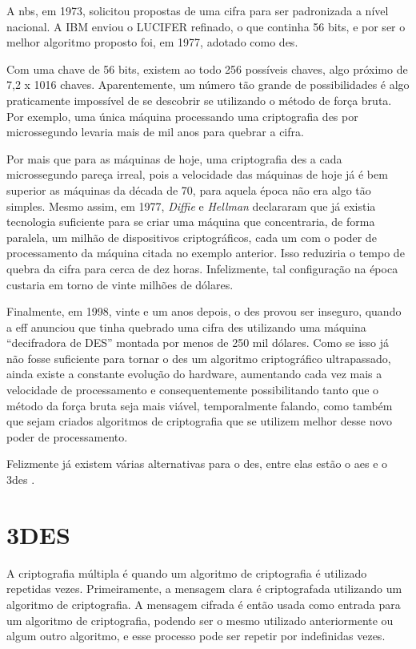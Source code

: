 A \acrfull{nbs}, em 1973, solicitou propostas de uma cifra para ser padronizada a nível nacional. A IBM enviou o LUCIFER refinado, o que continha 56 bits, e por ser o melhor algoritmo proposto foi, em 1977, adotado como \acrfull{des}.

Com uma chave de 56 bits, existem ao todo 256 possíveis chaves, algo próximo de 7,2 x 1016 chaves. Aparentemente, um número tão grande de possibilidades é algo praticamente impossível de se descobrir se utilizando o método de força bruta. Por exemplo, uma única máquina processando uma criptografia \acrshort{des} por microssegundo levaria mais de mil anos para quebrar a cifra.

Por mais que para as máquinas de hoje, uma criptografia \acrshort{des} a cada microssegundo pareça irreal, pois a velocidade das máquinas de hoje já é bem superior as máquinas da década de 70, para aquela época não era algo tão simples. Mesmo assim, em 1977, \textit{Diffie} e \textit{Hellman} declararam que já existia tecnologia suficiente para se criar uma máquina que concentraria, de forma paralela, um milhão de dispositivos criptográficos, cada um com o poder de processamento da máquina citada no exemplo anterior. Isso reduziria o tempo de quebra da cifra para cerca de dez horas. Infelizmente, tal configuração na época custaria em torno de vinte milhões de dólares.

Finalmente, em 1998, vinte e um anos depois, o \acrshort{des} provou ser inseguro, quando a \acrfull{eff} anunciou que tinha quebrado uma cifra \acrshort{des} utilizando uma máquina “decifradora de DES” montada por menos de 250 mil dólares. Como se isso já não fosse suficiente para tornar o \acrshort{des} um algoritmo criptográfico ultrapassado, ainda existe a constante evolução do hardware, aumentando cada vez mais a velocidade de processamento e consequentemente possibilitando tanto que o método da força bruta seja mais viável, temporalmente falando, como também que sejam criados algoritmos de criptografia que se utilizem melhor desse novo poder de processamento.

Felizmente já existem várias alternativas para o \acrshort{des}, entre elas estão o \acrfull{aes} e o \acrfull{3des} \cite{stallings14} \cite{tanenbaum03}.

\section{3DES}
\label{sec:3des}
A criptografia múltipla é quando um algoritmo de criptografia é utilizado repetidas vezes. Primeiramente, a mensagem clara é criptografada utilizando um algoritmo de criptografia. A mensagem cifrada é então usada como entrada para um algoritmo de criptografia, podendo ser o mesmo utilizado anteriormente ou algum outro algoritmo, e esse processo pode ser repetir por indefinidas vezes.

